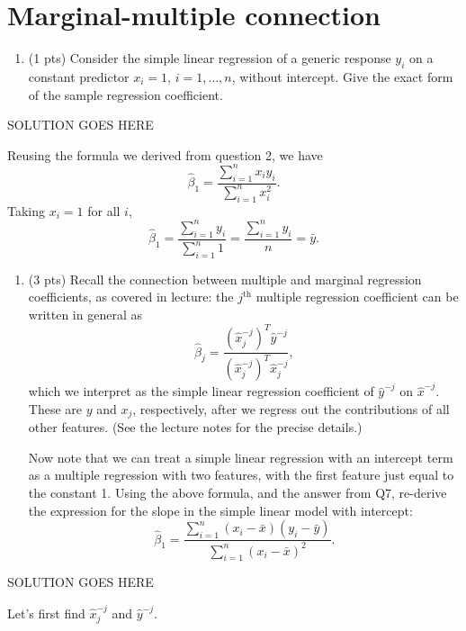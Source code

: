 \documentclass[
]{article}
\providecommand{\tightlist}{%
  \setlength{\itemsep}{0pt}\setlength{\parskip}{0pt}}
\begin{document}
\hypertarget{marginal-multiple-connection}{%
\section{Marginal-multiple
connection}\label{marginal-multiple-connection}}

\begin{enumerate}
\def\labelenumi{\arabic{enumi}.}
\setcounter{enumi}{6}
\tightlist
\item
  (1 pts) Consider the simple linear regression of a generic response
  \(y_i\) on a constant predictor \(x_i = 1\), \(i = 1,\dots,n\),
  without intercept. Give the exact form of the sample regression
  coefficient.
\end{enumerate}

SOLUTION GOES HERE

Reusing the formula we derived from question 2, we have
\[\hat{\beta}_1 = \frac{\sum_{i=1}^{n}x_iy_i}{\sum_{i=1}^{n}x_i^2}.\]
Taking \(x_i = 1\) for all \(i\),
\[\hat{\beta}_1 = \frac{\sum_{i=1}^{n}y_i}{\sum_{i=1}^{n}1} = \frac{\sum_{i=1}^{n}y_i}{n} = \bar{y}.\]

\begin{enumerate}
\def\labelenumi{\arabic{enumi}.}
\setcounter{enumi}{7}
\item
  (3 pts) Recall the connection between multiple and marginal regression
  coefficients, as covered in lecture: the \(j^{\text{th}}\) multiple
  regression coefficient can be written in general as \[
  \hat\beta_j = \frac{(\hat{x}^{-j}_j)^T \hat{y}^{-j}}
  {(\hat{x}^{-j}_j)^T \hat{x}^{-j}_j},
  \] which we interpret as the simple linear regression coefficient of
  \(\hat{y}^{-j}\) on \(\hat{x}^{-j}\). These are \(y\) and \(x_j\),
  respectively, after we regress out the contributions of all other
  features. (See the lecture notes for the precise details.)

  Now note that we can treat a simple linear regression with an
  intercept term as a multiple regression with two features, with the
  first feature just equal to the constant 1. Using the above formula,
  and the answer from Q7, re-derive the expression for the slope in the
  simple linear model with intercept: \[
  \hat\beta_1 = \frac{\sum_{i=1}^n (x_i - \bar{x}) (y_i - \bar{y})} 
    {\sum_{i=1}^n (x_i - \bar{x})^2}.
  \]
\end{enumerate}

SOLUTION GOES HERE

Let's first find \(\hat{x}_j^{-j}\) and \(\hat{y}^{-j}\).
\end{document}
